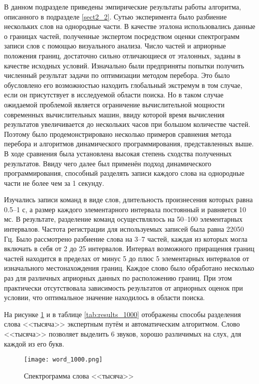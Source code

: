 В данном подразделе приведены эмпирические результаты работы алгоритма, описанного в подразделе \ref{sect2_2}.
Сутью эксперимента было разбиение нескольких слов на однородные части.
В качестве эталона использовались данные о границах частей, полученные экспертом посредством оценки спектрограмм записи слов с помощью визуального анализа.
Число частей и априорные положения границ, достаточно сильно отличающиеся от эталонных, заданы в качестве исходных условий.
Изначально были предприняты попытки получить численный результат задачи по оптимизации методом перебора.
Это было обусловлено его возможностью находить глобальный экстремум в том случае, если он присутствует в исследуемой области поиска.
Но в таком случае ожидаемой проблемой является ограничение вычислительной мощности современных вычислительных машин, ввиду которой время вычисления результатов увеличивается до нескольких часов при большом количестве частей.
Поэтому было продемонстрировано несколько примеров сравнения метода перебора и алгоритмов динамического программирования, представленных выше.
В ходе сравнения была установлена высокая степень сходства полученных результатов.
Ввиду чего далее был применён подход динамического программирования, способный разделять записи каждого слова на однородные части не более чем за 1 секунду.

Изучались записи команд в виде слов, длительность произнесения которых равна 0.5--1 с, а размер каждого элементарного интервала постоянный и равняется 10 мс.
В результате, разделение команд осуществлялось на 50--100 элементарных интервалов.
Частота регистрации для используемых записей была равна 22050 Гц.
Было рассмотрено разбиение слова на 3--7 частей, каждая из которых могла включать в себя от 2 до 25 интервалов.
Интервал возможного приращения границ частей находится в пределах от минус 5 до плюс 5 элементарных интервалов от изначального местонахождения границ.
Каждое слово было обработано несколько раз для различных априорных данных по расположению границ.
При этом практически отсутствовала зависимость результатов от априорных оценок при условии, что оптимальное значение находилось в области поиска.

На рисунке \ref{fig:word_1000} и в таблице \ref{tab:results_1000} отображены способы разделения слова <<тысяча>> экспертным путём и автоматическим алгоритмом.
Слово <<тысяча>> позволяет выделить 6 звуков, хорошо различимых на слух, для каждой из его букв.

\begin{figure}[h]
	\centering
	\texttt{[image: word\_1000.png]}
	\caption{Спектрограмма слова <<тысяча>>}
	\label{fig:word_1000}
\end{figure}

